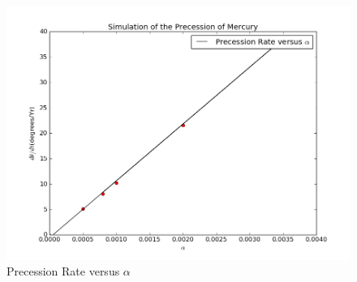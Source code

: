 \documentclass[10pt,a4paper]{article}
\begin{document}
    \begin{figure}[htbp]
    	\centering
    	\includegraphics[width=5in]{Mercury_3.png}
    	\caption{Precession Rate versus $\alpha$}
    \end{figure}
    
\end{document}

